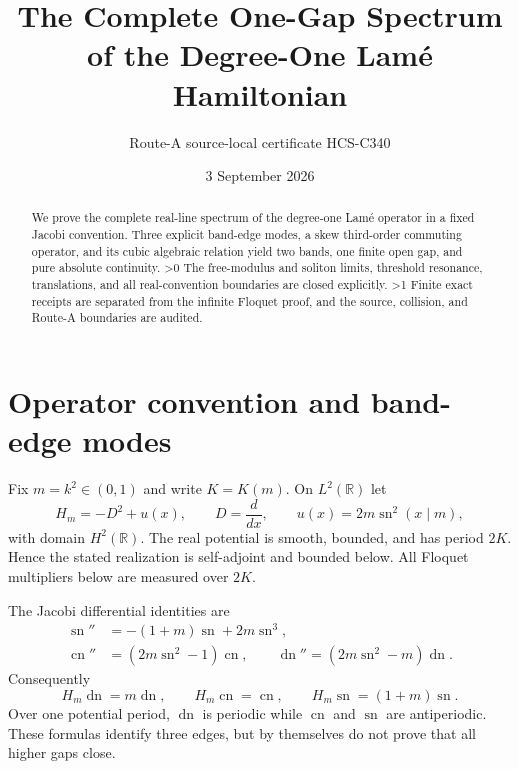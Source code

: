 \documentclass[10pt]{article}
\title{The Complete One-Gap Spectrum of the Degree-One Lam\'e Hamiltonian}
\author{Route-A source-local certificate HCS-C340}
\date{3 September 2026}
\providecommand{\CRevisionRound}{2}
\newcommand{\RR}{\mathbb R}
\newcommand{\HH}{H_m}
\newcommand{\sn}{\operatorname{sn}}
\newcommand{\cn}{\operatorname{cn}}
\newcommand{\dn}{\operatorname{dn}}
\begin{document}
\maketitle
\begin{abstract}
We prove the complete real-line spectrum of the degree-one Lam\'e operator in
a fixed Jacobi convention.  Three explicit band-edge modes, a skew
third-order commuting operator, and its cubic algebraic relation yield two
bands, one finite open gap, and pure absolute continuity.
\ifnum\CRevisionRound>0
The free-modulus and soliton limits, threshold resonance, translations, and
all real-convention boundaries are closed explicitly.
\fi
\ifnum\CRevisionRound>1
Finite exact receipts are separated from the infinite Floquet proof, and the
source, collision, and Route-A boundaries are audited.
\fi
\end{abstract}

\section{Operator convention and band-edge modes}
Fix $m=k^2\in(0,1)$ and write $K=K(m)$.  On $L^2(\RR)$ let
\begin{equation}\label{eq:H}
 \HH=-D^2+u(x),\qquad D=\frac{d}{dx},\qquad
 u(x)=2m\sn^2(x\mid m),
\end{equation}
with domain $H^2(\RR)$.  The real potential is smooth, bounded, and has
period $2K$.  Hence the stated realization is self-adjoint and bounded
below.  All Floquet multipliers below are measured over $2K$.

The Jacobi differential identities are
\begin{align}
 \sn''&=-(1+m)\sn+2m\sn^3,\label{eq:sn}\\
 \cn''&=(2m\sn^2-1)\cn,\qquad
 \dn''=(2m\sn^2-m)\dn.\label{eq:cndn}
\end{align}
Consequently
\begin{equation}\label{eq:edges}
 \HH\dn=m\dn,\qquad \HH\cn=\cn,\qquad
 \HH\sn=(1+m)\sn.
\end{equation}
Over one potential period, $\dn$ is periodic while $\cn$ and $\sn$ are
antiperiodic.  These formulas identify three edges, but by themselves do not
prove that all higher gaps close.
\end{document}
